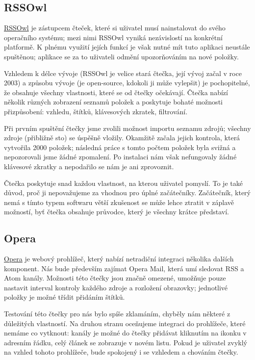 \subsection{RSSOwl}

\href{http://www.rssowl.org/}{RSSOwl} je zástupcem čteček, které si uživatel musí nainstalovat do svého operačního systému; mezi nimi RSSOwl vyniká nezávislostí na konkrétní platformě.
K plnému využití jejích funkcí je však nutné mít tuto aplikaci neustále spuštěnou; aplikace se za to uživateli odmění upozorňováním na nové položky.

Vzhledem k délce vývoje (RSSOwl je velice stará čtečka, její vývoj začal v roce 2003) a způsobu vývoje (je open-source, kdokoli ji může vylepšit) je pochopitelné, že obsahuje všechny vlastnosti, které se od čtečky očekávají.
Čtečka nabízí několik různých zobrazení seznamů položek a poskytuje bohaté možnosti přizpůsobení: vzhledu, štítků, klávesových zkratek, filtrování.

Při prvním spuštění čtečky jsme zvolili možnost importu seznamu zdrojů; všechny zdroje (přibližně sto) se úspěšně vložily.
Okamžitě začala jejich kontrola, která vytvořila 2000 položek; následná práce s tomto počtem položek byla svižná a nepozorovali jsme žádné zpomalení.
Po instalaci nám však nefungovaly žádné klávesové zkratky a nepodařilo se nám je ani zprovoznit.

Čtečka poskytuje snad každou vlastnost, na kterou uživatel pomyslí.
To je také důvod, proč ji nepovažujeme za vhodnou pro úplné začátečníky.
Začátečník, který nemá s tímto typem softwaru větší zkušenost se může lehce ztratit v záplavě možností, byť čtečka obsahuje průvodce, který je všechny krátce představí.

\subsection{Opera}

\href{http://www.opera.com/}{Opera} je webový prohlížeč, který nabízí netradiční integraci několika dalších komponent.
Nás bude především zajímat Opera Mail, která umí sledovat RSS a Atom kanály.
Možnosti této čtečky jsou značně omezené, umožňuje pouze nastavit interval kontroly každého zdroje a rozložení obrazovky; jednotlivé položky je možné třídit přidáním štítků.

Testování této čtečky pro nás bylo spíše zklamáním, chyběly nám některé z důležitých vlastností.
Na druhou stranu oceňujeme integraci do prohlížeče, které nemáme co vytknout: kanály je možné do čtečky přidávat kliknutím na ikonku v adresním řádku, celý článek se zobrazuje v novém listu.
Pokud je uživatel zvyklý na vzhled tohoto prohlížeče, bude spokojený i se vzhledem a chováním čtečky.

